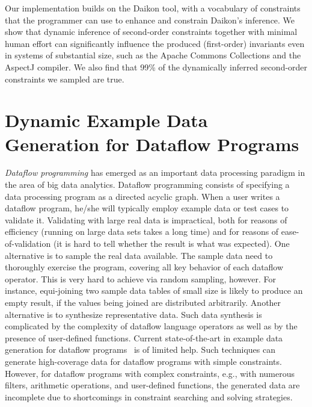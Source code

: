 \documentclass[proposal]{umthesis} %
\begin{document}
Our implementation builds on the Daikon tool, with a vocabulary of constraints that the programmer can use to enhance and constrain Daikon’s inference. We show that dynamic inference of second-order constraints together with minimal human effort can significantly influence the produced (first-order) invariants even in systems of substantial size, such as the Apache Commons Collections and the AspectJ compiler. We also find that 99\% of the dynamically inferred second-order constraints we sampled are true.

\section{Dynamic Example Data Generation for Dataflow Programs}

\emph{Dataflow programming} has emerged as an important data
processing paradigm in the area of big data analytics. Dataflow
programming consists of specifying a data processing program as a
directed acyclic graph. 
When a user writes a dataflow program, he/she will typically employ
example data or test cases to validate it. Validating with large real
data is impractical, both for reasons of efficiency (running on large
data sets takes a long time) and for reasons of ease-of-validation (it
is hard to tell whether the result is what was expected). One
alternative is to sample the real data available. The sample data need
to thoroughly exercise the program, covering all key behavior of each
dataflow operator. This is very hard to achieve via random sampling,
however. For instance, equi-joining two sample data tables of small
size is likely to produce an empty result, if the values being joined
are distributed arbitrarily.
Another alternative is to synthesize representative data.  Such data
synthesis is complicated by the complexity of dataflow language
operators as well as by the presence of user-defined functions.
Current state-of-the-art in example data generation for dataflow
programs~\cite{Olston:2009:GED:1559845.1559873} is of limited
help. Such techniques can generate high-coverage data for dataflow
programs with simple constraints. However, for dataflow programs with
complex constraints, e.g., with numerous filters, arithmetic
operations, and user-defined functions, the generated data are
incomplete due to shortcomings in constraint searching and solving
strategies.
\end{document}

